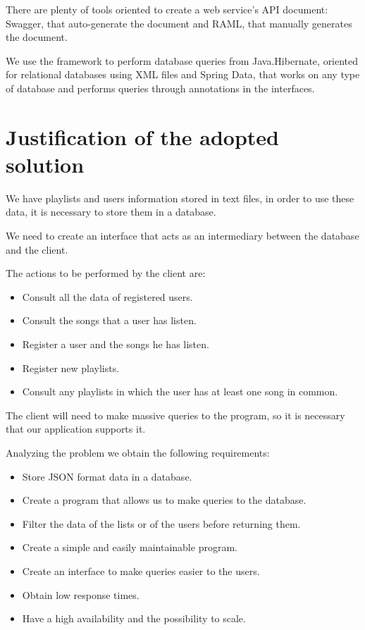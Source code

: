 \documentclass[12pt]{report} %
\begin{document}
There are plenty of tools oriented to create a web service's API document: Swagger, that auto-generate the document and RAML, that  manually generates the document.


We use the framework to perform database queries from Java.Hibernate, oriented for relational databases using XML files and Spring Data, that works on any type of database and performs queries through annotations in the interfaces.

\section{Justification of the adopted solution}

We have playlists and users information stored in text files, in order to use these data, it is necessary to store them in a database.

We need to create an interface that acts as an intermediary between the database and the client.

The actions to be performed by the client are:
\begin{itemize}
	\item Consult all the data of registered users.
	\item Consult the songs that a user has listen.
	\item Register a user and the songs he has listen.
	\item Register new playlists.
	\item Consult any playlists in which the user has at least one song in common.
\end{itemize}

The client will need to make massive queries to the program, so it is necessary that our application supports it.

Analyzing the problem we obtain the following requirements:
\begin{itemize}
	\item Store JSON format data in a database.
	\item Create a program that allows us to make queries to the database.
	\item Filter the data of the lists or of the users before returning them.
	\item Create a simple and easily maintainable program.
	\item Create an interface to make queries easier to the users.
	\item Obtain low response times.
	\item Have a high availability and the possibility to scale.
\end{itemize}
\end{document}
